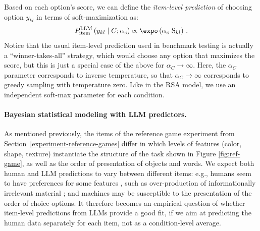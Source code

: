 \documentclass[fleqn]{article}
\begin{document}
Based on each option's score, we can define the \emph{item-level prediction} of choosing option $y_{kl}$ in terms of soft-maximization as:
%
\begin{align*}
P_{\text{item}}^{\text{LLM}}\left ( y_{kl} \mid C; \alpha_{c} \right ) \propto \expo \left (\alpha_{c} \ \text{S}_{kl} \right)\,.
\end{align*}
%
Notice that the usual item-level prediction used in benchmark testing is actually a ``winner-takes-all'' strategy, which would choose any option that maximizes the score, but this is just a special case of the above for $\alpha_{C} \rightarrow \infty$.
Here, the $\alpha_{C}$ parameter corresponds to inverse temperature, so that $\alpha_{C} \rightarrow \infty$ corresponds to greedy sampling with temperature zero.
Like in the RSA model, we use an independent soft-max parameter for each condition.

\paragraph{Bayesian statistical modeling with LLM predictors.}
As mentioned previously, the items of the reference game experiment from Section~\ref{experiment-reference-games} differ in which levels of features (color, shape, texture) instantiate the structure of the task shown in Figure \ref{fig:ref-game}, as well as the order of presentation of objects and words.
We expect both human and LLM predictions to vary between different items: e.g., humans seem to have preferences for some features \citep[e.g.,][]{QingFranke2013:Variations-on-a}, such as over-production of informationally irrelevant material \citep[e.g.,][]{DaviesKatsos2010:Over-informativ,Rubio-Fernandez2019:Overinformative,DegenHawkins2020:When-redundancy}; and machines may be susceptible to the presentation of the order of choice options.
It therefore becomes an empirical question of whether item-level predictions from LLMs provide a good fit, if we aim at predicting the human data separately for each item, not as a condition-level average.
\end{document}
